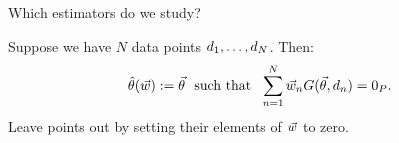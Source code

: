 \begin{frame}[t]{Which estimators do we study?}

Suppose we have $N$ data points $d_{1}, \ldots, d_{N}$.  Then:
%
\begin{align*}
%
\thetahat(\w) :=
\vec\theta \,\, \textrm{ such that } \,\,
\sumn
\w_{n} G(\vec\theta, \d_{n}) =  \zP .
%
\end{align*}
%
Leave points out by setting their elements of $\vec{w}$ to zero.

%
%
\vspace{1em}
%
\begin{columns}
%
\begin{column}{0.45\linewidth}
\end{column}
%
\begin{column}{0.45\linewidth}
\end{column}
\end{columns}


\end{frame}


